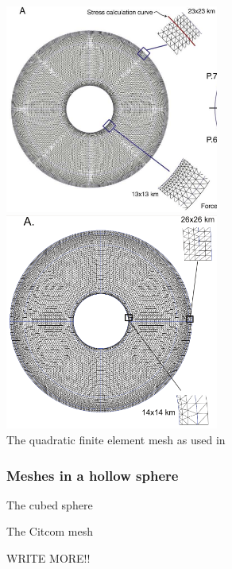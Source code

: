 \begin{center}
\includegraphics[width=7cm]{images/meshes/brhv08}
\includegraphics[width=7cm]{images/meshes/brva07a}\\
{\scriptsize The quadratic finite element mesh as used in \cite{brhv08,brva07a}}
\end{center}


\subsubsection{Meshes in a hollow sphere}

The cubed sphere \cite{roip96}

The Citcom mesh  \cite{thie18}

WRITE MORE!!
